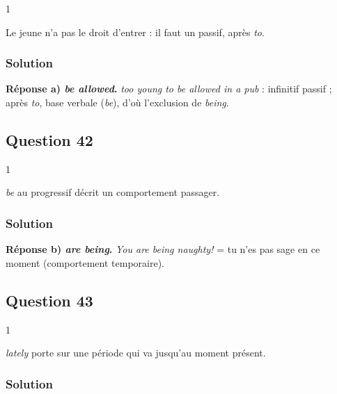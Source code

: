 \documentclass[11pt,a4paper]{article}
\begin{document}
\begin{indication}{1}

Le jeune n'a pas le droit d'entrer : il faut un passif, après \emph{to}.

\end{indication}

\hypertarget{solution-40}{%
\subsubsection{Solution}\label{solution-40}}

\textbf{Réponse a) \emph{be allowed}.} \emph{too young to be allowed in a pub} : infinitif passif ; après \emph{to}, base verbale (\emph{be}), d'où l'exclusion de \emph{being}.

\hypertarget{question-42}{%
\subsection{Question 42}\label{question-42}}

\begin{indication}{1}

\emph{be} au progressif décrit un comportement passager.

\end{indication}

\hypertarget{solution-41}{%
\subsubsection{Solution}\label{solution-41}}

\textbf{Réponse b) \emph{are being}.} \emph{You are being naughty!} = tu n'es pas sage en ce moment (comportement temporaire).

\hypertarget{question-43}{%
\subsection{Question 43}\label{question-43}}

\begin{indication}{1}

\emph{lately} porte sur une période qui va jusqu'au moment présent.

\end{indication}

\hypertarget{solution-42}{%
\subsubsection{Solution}\label{solution-42}}
\end{document}
